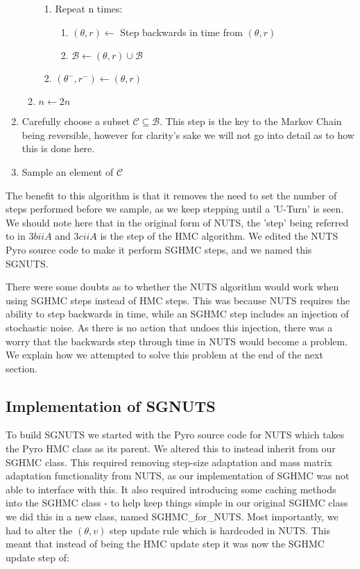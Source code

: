 \begin{enumerate}
\begin{enumerate}
\begin{enumerate}
 \item Repeat n times:
 \begin{enumerate}
     \item $(\theta, r) \leftarrow $ Step backwards in time from $(\theta, r)$
     \item $\mathcal{B} \leftarrow (\theta, r) \cup \mathcal{B}$
   \end{enumerate}
   \item $(\theta^-, r^-) \leftarrow (\theta, r)$
   
    \end{enumerate}
    \item $n \leftarrow 2n$
    \end{enumerate}
\item Carefully choose a subset $\mathcal{C} \subseteq \mathcal{B}$. This step is the key to the Markov Chain being reversible, however for clarity's sake we will not go into detail as to how this is done here.
\item Sample an element of $\mathcal{C}$

    \end{enumerate}



The benefit to this algorithm is that it removes the need to set the number of steps performed before we sample, as we keep stepping until a 'U-Turn' is seen. We should note here that in the original form of NUTS, the 'step' being referred to in $3biiA$ and $3ciiA$ is the step of the HMC algorithm. We edited the NUTS Pyro source code to make it perform SGHMC steps, and we named this SGNUTS.

There were some doubts as to whether the NUTS algorithm would work when using SGHMC steps instead of HMC steps. This was because NUTS requires the ability to step backwards in time, while an SGHMC step includes an injection of stochastic noise. As there is no action that undoes this injection, there was a worry that the backwards step through time in NUTS would become a problem. We explain how we attempted to solve this problem at the end of the next section.

\subsection{Implementation of SGNUTS}
To build SGNUTS we started with the Pyro source code for NUTS \cite{NUTS} which takes the Pyro HMC class as its parent. We altered this to instead inherit from our SGHMC class. This required removing step-size adaptation and mass matrix adaptation functionality from NUTS, as our implementation of SGHMC was not able to interface with this. It also required introducing some caching methods into the SGHMC class - to help keep things simple in our original SGHMC class we did this in a new class, named SGHMC\_for\_NUTS. Most importantly, we had to alter the $(\theta,v)$ step update rule which is hardcoded in NUTS. This meant that instead of being the HMC update step it was now the SGHMC update step of:


